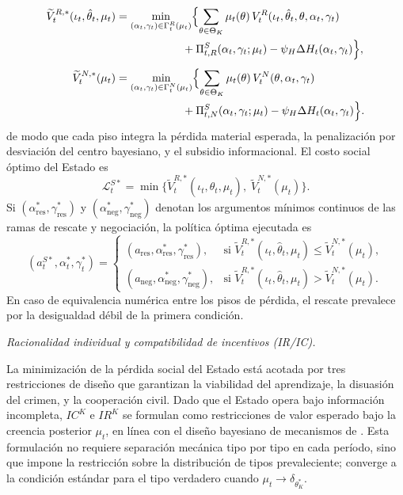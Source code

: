 \documentclass[pdflatex,sn-mathphys-ay]{sn-jnl}
\theoremstyle{thmstyleone}
\theoremstyle{thmstyletwo}
\theoremstyle{thmstylethree}
\newcommand{\ThetaK}{\Theta_K}
\newcommand{\1}{\mathbf{1}}
\begin{document}
\begin{align}
\widetilde{V}_t^{R,\ast}(\iota_t,\hat{\theta}_t,\mu_t)&=\min_{(\alpha_t,\gamma_t)\in\Gamma_t^R(\mu_t)}\Bigl\{\sum_{\theta\in\ThetaK}\mu_t(\theta)\,V_t^R(\iota_t,\hat{\theta}_t,\theta,\alpha_t,\gamma_t)\nonumber\\
&\qquad\qquad\qquad+\Pi_{t,R}^S(\alpha_t,\gamma_t;\mu_t)-\psi_H\Delta H_t(\alpha_t,\gamma_t)\Bigr\},\label{eq:piso-R}\\[4pt]
\widetilde{V}_t^{N,\ast}(\mu_t)&=\min_{(\alpha_t,\gamma_t)\in\Gamma_t^N(\mu_t)}\Bigl\{\sum_{\theta\in\ThetaK}\mu_t(\theta)\,V_t^N(\theta,\alpha_t,\gamma_t)\nonumber\\
&\qquad\qquad\qquad+\Pi_{t,N}^S(\alpha_t,\gamma_t;\mu_t)-\psi_H\Delta H_t(\alpha_t,\gamma_t)\Bigr\}.\label{eq:piso-N}
\end{align}
de modo que cada piso integra la pérdida material esperada, la penalización por desviación del centro bayesiano, y el subsidio informacional. El costo social óptimo del Estado es
\begin{equation}
\mathcal{L}_t^{S\ast}=\min\bigl\{\widetilde{V}_t^{R,\ast}(\iota_t,\hat{\theta}_t,\mu_t),\;\widetilde{V}_t^{N,\ast}(\mu_t)\bigr\}.
\label{eq:state-expected-loss}
\end{equation}
Si $(\alpha_{\mathrm{res}}^\ast,\gamma_{\mathrm{res}}^\ast)$ y $(\alpha_{\mathrm{neg}}^\ast,\gamma_{\mathrm{neg}}^\ast)$ denotan los argumentos mínimos continuos de las ramas de rescate y negociación, la política óptima ejecutada es
\begin{equation}
(a_t^{S\ast},\alpha_t^\ast,\gamma_t^\ast)=\begin{cases}(a_{\mathrm{res}},\alpha_{\mathrm{res}}^\ast,\gamma_{\mathrm{res}}^\ast), & \text{si }\widetilde{V}_t^{R,\ast}(\iota_t,\hat{\theta}_t,\mu_t)\le\widetilde{V}_t^{N,\ast}(\mu_t),\\[4pt](a_{\mathrm{neg}},\alpha_{\mathrm{neg}}^\ast,\gamma_{\mathrm{neg}}^\ast), & \text{si }\widetilde{V}_t^{R,\ast}(\iota_t,\hat{\theta}_t,\mu_t)>\widetilde{V}_t^{N,\ast}(\mu_t).\end{cases}
\label{eq:state-discrete-rule}
\end{equation}
En caso de equivalencia numérica entre los pisos de pérdida, el rescate prevalece por la desigualdad débil de la primera condición.

\medskip
\noindent\textit{Racionalidad individual y compatibilidad de incentivos (IR/IC).}

\noindent La minimización de la pérdida social del Estado está acotada por tres restricciones de diseño que garantizan la viabilidad del aprendizaje, la disuasión del crimen, y la cooperación civil. Dado que el Estado opera bajo información incompleta, $IC^K$ e $IR^K$ se formulan como restricciones de valor esperado bajo la creencia posterior $\mu_t$, en línea con el diseño bayesiano de mecanismos de \citet{HolmstromMyerson1983}. Esta formulación no requiere separación mecánica tipo por tipo en cada período, sino que impone la restricción sobre la distribución de tipos prevaleciente; converge a la condición estándar para el tipo verdadero cuando $\mu_t\to\delta_{\theta_K^\ast}$.
\end{document}
